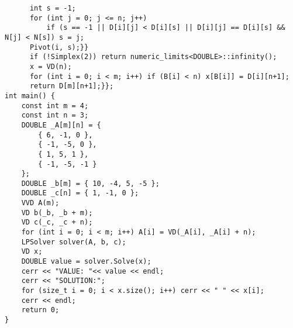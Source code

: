 \documentclass[11pt, oneside]{article}
\begin{document}
\begin{lstlisting}
      int s = -1;
      for (int j = 0; j <= n; j++) 
          if (s == -1 || D[i][j] < D[i][s] || D[i][j] == D[i][s] && N[j] < N[s]) s = j;
      Pivot(i, s);}}
      if (!Simplex(2)) return numeric_limits<DOUBLE>::infinity();
      x = VD(n);
      for (int i = 0; i < m; i++) if (B[i] < n) x[B[i]] = D[i][n+1];
      return D[m][n+1];}};
int main() {
    const int m = 4;
    const int n = 3;  
    DOUBLE _A[m][n] = {
        { 6, -1, 0 },
        { -1, -5, 0 },
        { 1, 5, 1 },
        { -1, -5, -1 }
    };
    DOUBLE _b[m] = { 10, -4, 5, -5 };
    DOUBLE _c[n] = { 1, -1, 0 };
    VVD A(m);
    VD b(_b, _b + m);
    VD c(_c, _c + n);
    for (int i = 0; i < m; i++) A[i] = VD(_A[i], _A[i] + n);
    LPSolver solver(A, b, c);
    VD x;
    DOUBLE value = solver.Solve(x);
    cerr << "VALUE: "<< value << endl;
    cerr << "SOLUTION:";
    for (size_t i = 0; i < x.size(); i++) cerr << " " << x[i];
    cerr << endl;
    return 0;
}

\end{lstlisting}
\end{document}
